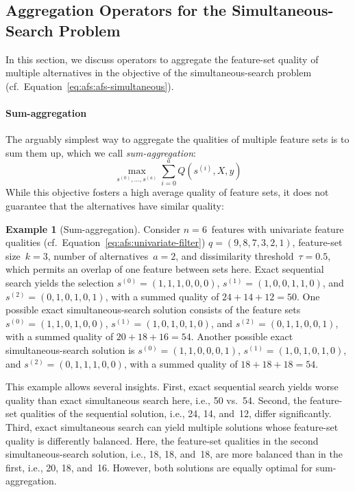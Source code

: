 \documentclass{article}
\theoremstyle{definition}
\newtheorem{example}{Example}
\begin{document}
\subsection{Aggregation Operators for the Simultaneous-Search Problem}
\label{sec:afs:appendix:simultaneous-objective-aggregation}

In this section, we discuss operators to aggregate the feature-set quality of multiple alternatives in the objective of the simultaneous-search problem (cf.~Equation~\ref{eq:afs:afs-simultaneous}).

\paragraph{Sum-aggregation}

The arguably simplest way to aggregate the qualities of multiple feature sets is to sum them up, which we call \emph{sum-aggregation}:
%
\begin{equation}
	\max_{s^{(0)}, \dots, s^{(a)}} \sum_{i=0}^a Q(s^{(i)},X,y)
	\label{eq:afs:afs-simultaneous-sum-objective}
\end{equation}
%
While this objective fosters a high average quality of feature sets, it does not guarantee that the alternatives have similar quality:
%
\begin{example}[Sum-aggregation]
Consider $n=6$~features with univariate feature qualities (cf.~Equation~\ref{eq:afs:univariate-filter}) $q = (9,8,7,3,2,1)$, feature-set size~$k=3$, number of alternatives~$a=2$, and dissimilarity threshold~$\tau = 0.5$, which permits an overlap of one feature between sets here.
Exact sequential search yields the selection $s^{(0)} = (1,1,1,0,0,0)$, $s^{(1)} = (1,0,0,1,1,0)$, and $s^{(2)} = (0,1,0,1,0,1)$, with a summed quality of $24+14+12=50$.
One possible exact simultaneous-search solution consists of the feature sets $s^{(0)} = (1,1,0,1,0,0)$, $s^{(1)} = (1,0,1,0,1,0)$, and $s^{(2)} = (0,1,1,0,0,1)$, with a summed quality of $20+18+16=54$.
Another possible exact simultaneous-search solution is $s^{(0)} = (1,1,0,0,0,1)$, $s^{(1)} = (1,0,1,0,1,0)$, and $s^{(2)} = (0,1,1,1,0,0)$, with a summed quality of $18+18+18=54$.
\label{ex:afs:sum-aggregation}
\end{example}
%
This example allows several insights.
First, exact sequential search yields worse quality than exact simultaneous search here, i.e., 50 vs.~54.
Second, the feature-set qualities of the sequential solution, i.e., 24, 14, and~12, differ significantly.
Third, exact simultaneous search can yield multiple solutions whose feature-set quality is differently balanced.
Here, the feature-set qualities in the second simultaneous-search solution, i.e., 18, 18, and~18, are more balanced than in the first, i.e., 20, 18, and~16.
However, both solutions are equally optimal for sum-aggregation.
\end{document}
